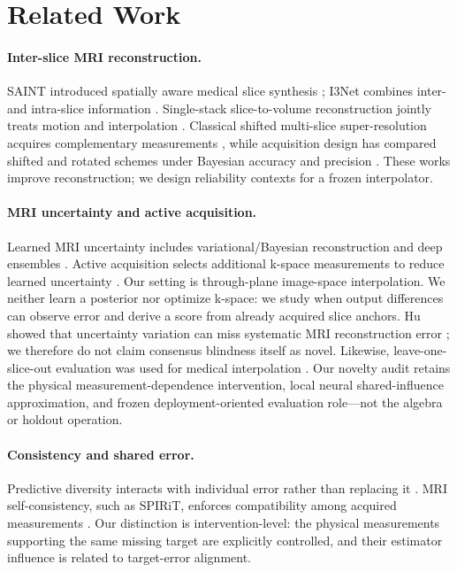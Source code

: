 \documentclass[10pt,twocolumn,letterpaper]{article}
\begin{document}
\section{Related Work}
\paragraph{Inter-slice MRI reconstruction.} SAINT introduced spatially aware medical slice synthesis \cite{peng2020saint}; I3Net combines inter- and intra-slice information \cite{song2024i3net}. Single-stack slice-to-volume reconstruction jointly treats motion and interpolation \cite{young2024svr}. Classical shifted multi-slice super-resolution acquires complementary measurements \cite{greenspan2002interslice}, while acquisition design has compared shifted and rotated schemes under Bayesian accuracy and precision \cite{nicastro2022shift}. These works improve reconstruction; we design reliability contexts for a frozen interpolator.

\paragraph{MRI uncertainty and active acquisition.} Learned MRI uncertainty includes variational/Bayesian reconstruction and deep ensembles \cite{narnhofer2022bayesian,kustner2024ensembles}. Active acquisition selects additional k-space measurements to reduce learned uncertainty \cite{zhang2019active}. Our setting is through-plane image-space interpolation. We neither learn a posterior nor optimize k-space: we study when output differences can observe error and derive a score from already acquired slice anchors.
Hu \etal showed that uncertainty variation can miss systematic MRI reconstruction error \cite{hu2021predict}; we therefore do not claim consensus blindness itself as novel. Likewise, leave-one-slice-out evaluation was used for medical interpolation \cite{horvath2017highorder}. Our novelty audit retains the physical measurement-dependence intervention, local neural shared-influence approximation, and frozen deployment-oriented evaluation role---not the algebra or holdout operation.

\paragraph{Consistency and shared error.} Predictive diversity interacts with individual error rather than replacing it \cite{brown2005diversity,ortega2022diversity}. MRI self-consistency, such as SPIRiT, enforces compatibility among acquired measurements \cite{lustig2010spirit}. Our distinction is intervention-level: the physical measurements supporting the same missing target are explicitly controlled, and their estimator influence is related to target-error alignment.
\end{document}
